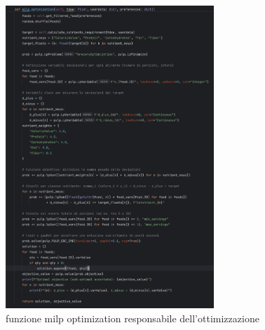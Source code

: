 \documentclass[11pt,a4paper]{article}
\begin{document}
\begin{figure}[h!]
    \centering
    \includegraphics[width=0.7\textwidth]{milp_optimization.png}
    \caption{funzione milp optimization responsabile dell'ottimizzazione}
    \label{fig:milp_optimization}
\end{figure}
\end{document}
